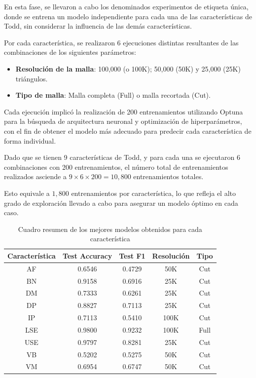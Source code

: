 En esta fase, se llevaron a cabo los denominados experimentos de etiqueta única, donde se entrena un modelo independiente para cada una de las características de Todd, sin considerar la influencia de las demás características.

Por cada característica, se realizaron 6 ejecuciones distintas resultantes de las combinaciones de los siguientes parámetros:

\begin{itemize}
\item \textbf{Resolución de la malla}: 100,000 (o 100K); 50,000 (50K) y 25,000 (25K) triángulos.
\item \textbf{Tipo de malla}: Malla completa (Full) o malla recortada (Cut).
\end{itemize}

Cada ejecución implicó la realización de 200 entrenamientos utilizando Optuna para la búsqueda de arquitectura neuronal y optimización de hiperparámetros, con el fin de obtener el modelo más adecuado para predecir cada característica de forma individual.

Dado que se tienen 9 características de Todd, y para cada una se ejecutaron 6 combinaciones con 200 entrenamientos, el número total de entrenamientos realizados asciende a $9\times6\times200=10,800$ entrenamientos totales.

Esto equivale a $1,800$ entrenamientos por característica, lo que refleja el alto grado de exploración llevado a cabo para asegurar un modelo óptimo en cada caso.

\begin{table}[h]
    \centering
    \begin{tabular}{|c|c|c|c|c|}
    \hline
    \rowcolor[HTML]{D33333} 
    {\color[HTML]{FFFFFF} Característica} & {\color[HTML]{FFFFFF} Test Accuracy} & {\color[HTML]{FFFFFF} Test F1} & {\color[HTML]{FFFFFF} Resolución} & {\color[HTML]{FFFFFF} Tipo} \\ \hline
    AF & 0.6546 & 0.4729 & 50K & Cut \\
    BN & 0.9158 & 0.6916 & 25K & Cut \\
    DM & 0.7333 & 0.6261 & 25K & Cut \\
    DP & 0.8827 & 0.7113 & 25K & Cut \\
    IP & 0.7113 & 0.5410 & 100K & Cut \\
    LSE & 0.9800 & 0.9232 & 100K & Full \\
    USE & 0.9797 & 0.8281 & 25K & Cut \\
    VB & 0.5202 & 0.5275 & 50K & Cut \\
    VM & 0.6954 & 0.6747 & 50K & Cut \\ \hline
    \end{tabular}
    \caption{Cuadro resumen de los mejores modelos obtenidos para cada característica}
    \label{table5:single_tag__results}
\end{table}


